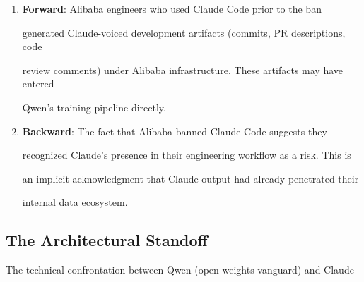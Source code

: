 \begin{enumerate}





  \item \textbf{Forward}: Alibaba engineers who used Claude Code prior to the ban





    generated Claude-voiced development artifacts (commits, PR descriptions, code





    review comments) under Alibaba infrastructure. These artifacts may have entered





    Qwen's training pipeline directly.





  \item \textbf{Backward}: The fact that Alibaba banned Claude Code suggests they





    recognized Claude's presence in their engineering workflow as a risk. This is





    an implicit acknowledgment that Claude output had already penetrated their





    internal data ecosystem.





\end{enumerate}











\subsection{The Architectural Standoff}











The technical confrontation between Qwen (open-weights vanguard) and Claude





